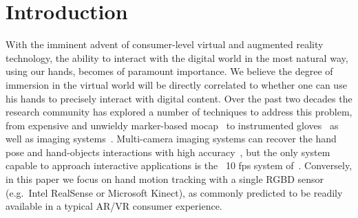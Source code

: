 % 
% 
% 
% 



\section{Introduction}
With the imminent advent of consumer-level virtual and augmented reality technology, the ability to interact with the digital world in the most natural way, using our hands, becomes of paramount importance. 
% 
We believe the degree of immersion in the virtual world will be directly correlated to whether one can use his hands to precisely interact with digital content. 
% 
% 
Over the past two decades the research community has explored a number of techniques to address this problem, from expensive and unwieldy marker-based mocap~\cite{mocapsurvey} to instrumented gloves~\cite{dipietro2008survey} as well as imaging systems~\cite{erol2007survey}. Multi-camera imaging systems can recover the hand pose and hand-objects interactions with high accuracy~\cite{ballan2013salient}, but the only system capable to approach interactive applications is the ~10 fps system of~\cite{sridhar2013multicam}. Conversely, in this paper we focus on hand motion tracking with a single RGBD sensor (e.g.\ Intel RealSense or Microsoft Kinect), as commonly predicted to be readily available in a typical AR/VR consumer experience.

